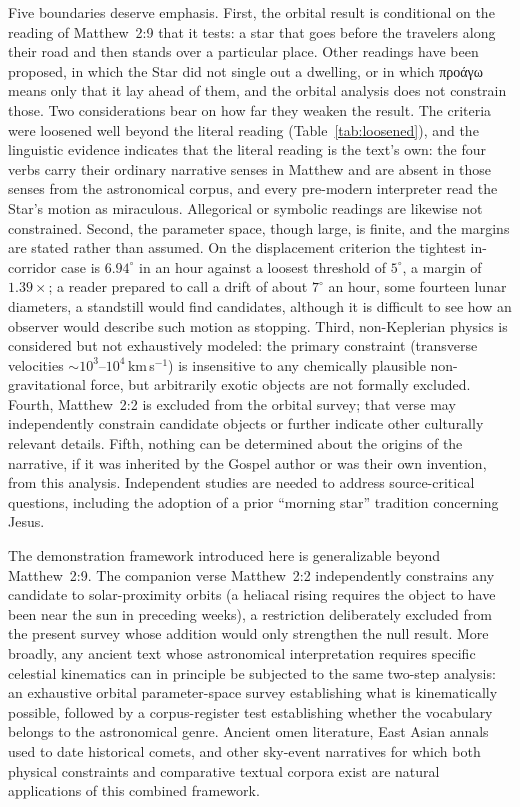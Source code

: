 \documentclass[sn-nature]{sn-jnl}
\newcommand{\grk}[1]{{\fontencoding{LGR}\selectfont #1}}
\newcommand{\grk}[1]{{\greekfont #1}}
\begin{document}
Five boundaries deserve emphasis. First, the orbital result is conditional on
the reading of Matthew~2:9 that it tests: a star that goes before the
travelers along their road and then stands over a particular place. Other
readings have been proposed, in which the Star did not single out a dwelling,
or in which \grk{προάγω} means only that it lay ahead of them, and the orbital
analysis does not constrain those. Two considerations bear on how far they
weaken the result. The criteria were loosened well beyond the literal reading
(Table~\ref{tab:loosened}), and the linguistic evidence indicates that the
literal reading is the text's own: the four verbs carry their ordinary
narrative senses in Matthew and are absent in those senses from the
astronomical corpus, and every pre-modern interpreter read the Star's motion
as miraculous\cite{adair2012}. Allegorical or symbolic readings are likewise
not constrained. Second, the parameter space, though large, is finite, and
the margins are stated rather than assumed. On the displacement criterion the
tightest in-corridor case is $6.94^\circ$ in an hour against a loosest
threshold of $5^\circ$, a margin of $1.39\times$; a reader prepared to call a
drift of about $7^\circ$ an hour, some fourteen lunar diameters, a standstill
would find candidates, although it is difficult to see how an observer would
describe such motion as stopping. Third, non-Keplerian physics is
considered but not exhaustively modeled: the primary constraint (transverse
velocities $\sim\!10^3$--$10^4$\,km\,s$^{-1}$) is insensitive to any
chemically plausible non-gravitational force, but arbitrarily exotic objects
are not formally excluded. Fourth, Matthew~2:2 is excluded from the orbital
survey; that verse may independently constrain candidate objects or further indicate 
other culturally relevant details. Fifth, nothing can be determined 
about the origins of the narrative, if it was inherited by the Gospel author or was their 
own invention, from this analysis. Independent studies are needed to address source-critical 
questions, including the adoption of a prior ``morning star'' tradition concerning Jesus\cite{adair_jsnt}.

The demonstration framework introduced here is generalizable beyond Matthew~2:9.
The companion verse Matthew~2:2 independently constrains any candidate to
solar-proximity orbits (a heliacal rising requires the object to have been near
the sun in preceding weeks), a restriction deliberately excluded from the
present survey whose addition would only strengthen the null result.
More broadly, any ancient text whose astronomical interpretation requires
specific celestial kinematics can in principle be subjected to the same
two-step analysis: an exhaustive orbital parameter-space survey establishing
what is kinematically possible, followed by a corpus-register test establishing
whether the vocabulary belongs to the astronomical genre.
Ancient omen literature, East Asian annals used to date historical comets,
and other sky-event narratives for which both physical constraints and
comparative textual corpora exist are natural applications of this combined framework.
\end{document}
